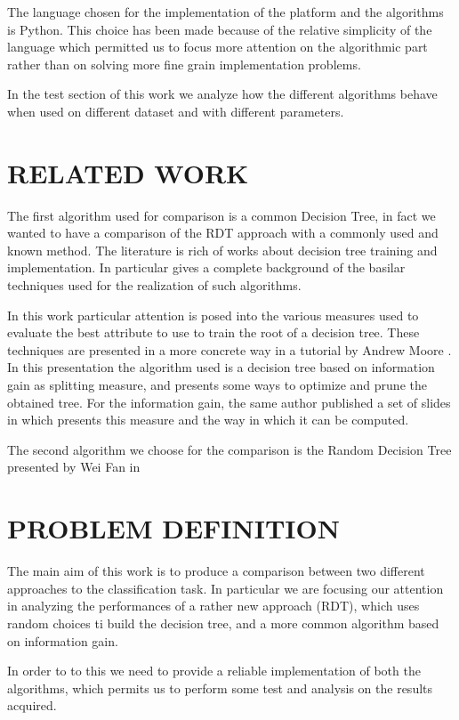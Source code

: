 \documentclass{acm_proc_article-sp-sigmod07}
\begin{document}
The language chosen for the implementation of the platform and the
algorithms is Python. This choice has been made because of the relative
simplicity of the language which permitted us to focus more attention on
the algorithmic part rather than on solving more fine grain implementation
problems.

In the test section of this work we analyze how the different algorithms
behave when used on different dataset and with different parameters. 

\section{RELATED WORK}

The first algorithm used for comparison is a common Decision Tree, in fact
we wanted to have a comparison of the RDT approach with a commonly used
and known method.
The literature is rich of works about decision tree training and
implementation. In particular \cite{quinlan:induction} gives a complete
background of the basilar techniques used for the realization of such
algorithms.

In this work particular attention is posed into the various measures used
to evaluate the best attribute to use to train the root of a decision
tree.
These techniques are presented in a more concrete way in a tutorial by
Andrew Moore \cite{moore:dtree}. In this presentation the algorithm used is
a decision tree based on information gain as splitting measure, and
presents some ways to optimize and prune the obtained tree.
For the information gain, the same author published a set of slides
in which presents this measure and the way in which it can be computed.

The second algorithm we choose for the comparison is the Random Decision
Tree presented by Wei Fan in \cite{fan:rdt}

\section{PROBLEM DEFINITION}
The main aim of this work is to produce a comparison between two different
approaches to the classification task. In particular we are focusing our
attention in analyzing the performances of a rather new approach (RDT),
which uses random choices ti build the decision tree, and a more common
algorithm based on information gain.

In order to to this we need to provide a reliable implementation of both
the algorithms, which permits us to perform some test and analysis on the
results acquired.
\end{document}
